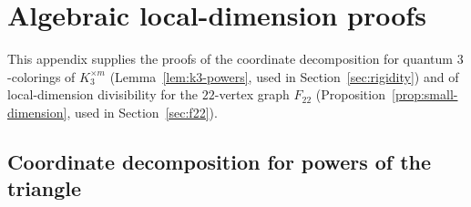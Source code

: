 \section{Algebraic local-dimension proofs}\label{app:dimension}

This appendix supplies the proofs of the coordinate decomposition for quantum $3$-colorings of $K_3^{\times m}$ (Lemma~\ref{lem:k3-powers}, used in Section~\ref{sec:rigidity}) and of local-dimension divisibility for the $22$-vertex graph $F_{22}$ (Proposition~\ref{prop:small-dimension}, used in Section~\ref{sec:f22}).

\subsection{Coordinate decomposition for powers of the triangle}\label{app:k3-powers}

